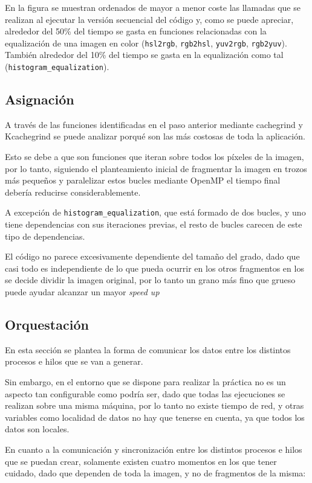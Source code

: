 \documentclass[12pt]{report} %
\begin{document}
En la figura  se muestran ordenados de mayor a menor coste las llamadas que se
realizan al ejecutar la versión secuencial del código y, como se puede apreciar, alrededor del 50\% del tiempo
se gasta en funciones relacionadas con la equalización de una imagen en color (\texttt{hsl2rgb}, \texttt{rgb2hsl},
\texttt{yuv2rgb}, \texttt{rgb2yuv}). También alrededor del 10\% del tiempo se gasta en la equalización como tal
(\texttt{histogram\_equalization}).


\subsection{Asignación}

A través de las funciones identificadas en el paso anterior mediante cachegrind y Kcachegrind se puede
analizar porqué son las más costosas de toda la aplicación.

Esto se debe a que son funciones que iteran sobre todos los píxeles de la imagen, por lo tanto, siguiendo el
planteamiento inicial de fragmentar la imagen en trozos más pequeños y paralelizar estos bucles mediante
OpenMP el tiempo final debería reducirse considerablemente.

A excepción de \texttt{histogram\_equalization}, que está formado de dos bucles, y uno tiene dependencias
con sus iteraciones previas, el resto de bucles carecen de este tipo de dependencias.

El código no parece excesivamente dependiente del tamaño del grado, dado que casi todo es independiente de
lo que pueda ocurrir en los otros fragmentos en los se decide dividir la imagen original, por lo tanto un
grano más fino que grueso puede ayudar alcanzar un mayor \textit{speed up}

\subsection{Orquestación}

En esta sección se plantea la forma de comunicar los datos entre los distintos procesos e hilos que se van a generar.

Sin embargo, en el entorno que se dispone para realizar la práctica no es un aspecto tan configurable como podría ser,
dado que todas las ejecuciones se realizan sobre una misma máquina, por lo tanto no existe tiempo de red, y otras
variables como localidad de datos no hay que tenerse en cuenta, ya que todos los datos son locales.

En cuanto a la comunicación y sincronización entre los distintos procesos e hilos que se puedan crear, solamente existen
cuatro momentos en los que tener cuidado, dado que dependen de toda la imagen, y no de fragmentos de la misma:
\end{document}
